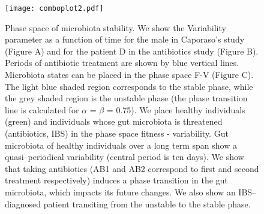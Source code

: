 \documentclass[12pt]{article}
\begin{document}
\begin{figure}[!ht]
\texttt{[image: comboplot2.pdf]}
\caption{Phase space of microbiota stability. We show the Variability parameter as a function of time for the male in Caporaso's study\cite{moving} (Figure A) and for the patient D in the antibiotics study\cite{antibiotic} (Figure B). Periods of antibiotic treatment are shown by blue vertical lines. Microbiota states can be placed in the phase space F-V (Figure C). The light blue shaded region corresponds to the stable phase, while the grey shaded region is the unstable phase (the phase transition line is calculated for  $\alpha$ = $\beta$ = 0.75). We place healthy individuals (green) and individuals whose gut microbiota is threatened (antibiotics, IBS) in the phase space fitness - variability. Gut microbiota of healthy individuals over a long term span show a quasi--periodical variability (central period is ten days). We show that taking antibiotics (AB1 and AB2 correspond to first and second treatment respectively) induces a phase transition in the gut microbiota, which impacts its future changes. We also show an IBS--diagnosed patient transiting from the unstable to the stable phase.}
\end{figure}
\end{document}
